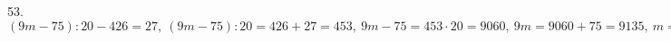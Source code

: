 53. $(9m-75):20-426=27,\ (9m-75):20=426+27=453,\ 9m-75=453\cdot20=9060,\ 9m=9060+75=9135,\ m=9135:9=1015.$\\
